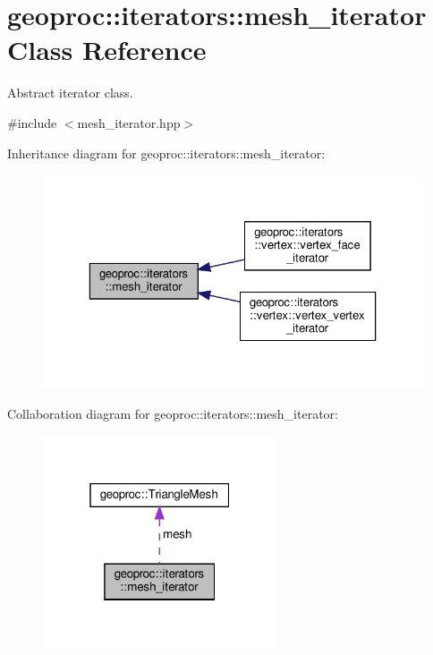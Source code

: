 \hypertarget{classgeoproc_1_1iterators_1_1mesh__iterator}{}\section{geoproc\+:\+:iterators\+:\+:mesh\+\_\+iterator Class Reference}
\label{classgeoproc_1_1iterators_1_1mesh__iterator}


Abstract iterator class.  




{\ttfamily \#include $<$mesh\+\_\+iterator.\+hpp$>$}



Inheritance diagram for geoproc\+:\+:iterators\+:\+:mesh\+\_\+iterator\+:\nopagebreak
\begin{figure}[H]
\begin{center}
\leavevmode
\includegraphics[width=323pt]{classgeoproc_1_1iterators_1_1mesh__iterator__inherit__graph}
\end{center}
\end{figure}


Collaboration diagram for geoproc\+:\+:iterators\+:\+:mesh\+\_\+iterator\+:\nopagebreak
\begin{figure}[H]
\begin{center}
\leavevmode
\includegraphics[width=196pt]{classgeoproc_1_1iterators_1_1mesh__iterator__coll__graph}
\end{center}
\end{figure}
